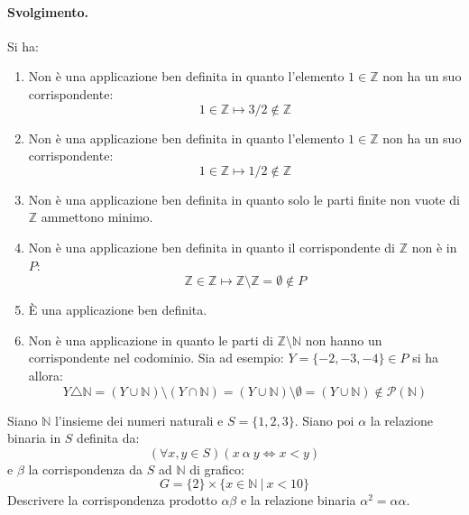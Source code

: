 \paragraph{Svolgimento.} Si ha:
\begin{enumerate}
	\item Non è una applicazione ben definita in quanto l'elemento $1 \in \mathbb{Z}$ non ha un suo corrispondente:
	\begin{displaymath}
		1 \in \mathbb{Z} \mapsto 3/2 \notin \mathbb{Z}
	\end{displaymath}
	\item Non è una applicazione ben definita in quanto l'elemento $1 \in \mathbb{Z}$ non ha un suo corrispondente:
	\begin{displaymath}
		1 \in \mathbb{Z} \mapsto 1/2 \notin \mathbb{Z}
	\end{displaymath}
	\item Non è una applicazione ben definita in quanto solo le parti finite non vuote di $\mathbb{Z}$ ammettono minimo.
	\item Non è una applicazione ben definita in quanto il corrispondente di $\mathbb{Z}$ non è in $P$:
	\begin{displaymath}
		\mathbb{Z} \in \mathbb{Z} \mapsto \mathbb{Z} \setminus \mathbb{Z} = \emptyset \notin P
	\end{displaymath}
	\item È una applicazione ben definita.
	\item Non è una applicazione in quanto le parti di $\mathbb{Z}\setminus \mathbb{N}$ non hanno un corrispondente nel codominio. Sia ad esempio: $Y=\{-2,-3,-4\}\in P$ si ha allora:
	\begin{displaymath}
		Y \triangle \mathbb{N} = (Y \cup \mathbb{N}) \setminus (Y \cap \mathbb{N}) = (Y \cup \mathbb{N}) \setminus \emptyset = (Y \cup \mathbb{N}) \notin \mathcal{P}(\mathbb{N})
	\end{displaymath}
\end{enumerate}
\begin{flushright}
	\blacksquare
\end{flushright}
\begin{exsbox}
	Siano $\mathbb{N}$ l'insieme dei numeri naturali e $S=\{1,2,3\}$. Siano poi $\alpha$ la relazione binaria in $S$ definita da:
	\begin{displaymath}
		(\forall x,y \in S)(x \ \alpha \ y \iff x <y)
	\end{displaymath}
	e $\beta$ la corrispondenza da $S$ ad $\mathbb{N}$ di grafico:
	\begin{displaymath}
		G= \{2\} \times \{x \in \mathbb{N} \ | \ x <10\}
	\end{displaymath}
	Descrivere la corrispondenza prodotto $\alpha \beta$ e la relazione binaria $\alpha^{2}=\alpha \alpha$.
\end{exsbox}
